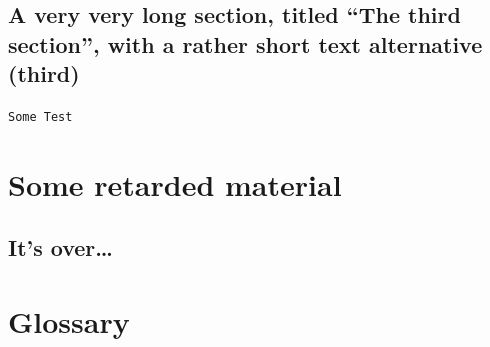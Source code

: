 \documentclass[11pt,mscthesis]{eapsthesis}
\begin{document}
\section[third]{A very very long section, titled ``The third section'', with
  a rather  short text alternative (third)}
\lipsum \texttt{Some Test}

\nocite{*}

\appendix %

\chapter{Some retarded material}
\section{It's over\dots}
\lipsum 

\backmatter

\chapter{Glossary} %

\printbibliography


\end{document}
